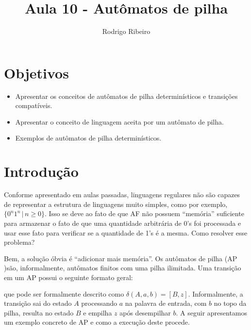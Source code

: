 \documentclass[a4paper]{article}
\theoremstyle{definition}
\begin{document}
  \title{Aula 10 - Autômatos de pilha}
  \author{Rodrigo Ribeiro}

  \maketitle


  \pagestyle{fancy}


  \section*{Objetivos}

  \begin{itemize}
     \item Apresentar os conceitos de autômatos de pilha determinísticos e
       transições compatíveis.
     \item Apresentar o conceito de linguagem aceita por um autômato de pilha.
     \item Exemplos de autômatos de pilha determinísticos.
  \end{itemize}

  \section{Introdução}

  Conforme apresentado em aulas passadas, linguagens regulares não são capazes
  de representar a estrutura de linguagens muito simples, como por exemplo,
  $\{0^n1^n\,|\,n\geq 0\}$. Isso se deve ao fato de que AF não possuem
  ``memória'' suficiente para armazenar o fato de que uma quantidade arbitrária
  de 0's foi processada e usar esse fato para verificar se a quantidade de 1's é
  a mesma. Como resolver esse problema?

  Bem, a solução óbvia é ``adicionar mais memória''. Os autômatos de pilha (AP )são,
  informalmente, autômatos finitos com uma pilha ilimitada. Uma transição em
  um AP possui o seguinte formato geral:
  \begin{figure}[H]
    \centering
  \end{figure}
  que pode ser formalmente descrito como $\delta(A,a,b) = [B,z]$. Informalmente,
  a transição sai do estado $A$ processando $a$ na palavra de entrada, com $b$
  no topo da pilha, resulta no estado $B$ e empilha $z$ após desempilhar $b$.
  A seguir apresentamos um exemplo concreto de AP e como a execução deste
  procede.
\end{document}
